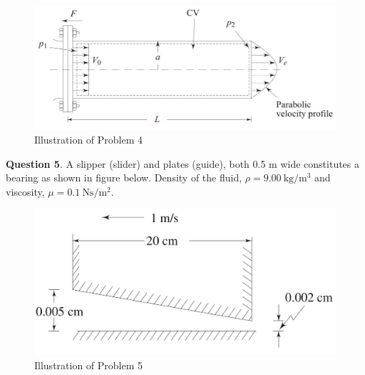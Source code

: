\documentclass{article}
\begin{document}
\begin{figure}[h]
    \centering
    \includegraphics{Problem4.jpg}
    \caption{Illustration of Problem 4}
    \label{fig:figprob4}
\end{figure}

\break

\textbf{Question 5}. A slipper (slider) and plates (guide), both 0.5 m wide constitutes a bearing as shown in figure below. Density of the fluid, $\rho = 9.00\ \textrm{kg/}\textrm{m}^3$ and viscosity, $\mu = 0.1\ \textrm{Ns/}\textrm{m}^2$.

\begin{figure}[h]
    \centering
    \includegraphics{Problem5.jpg}
    \caption{Illustration of Problem 5}
    \label{fig:figprob5}
\end{figure}
\end{document}
